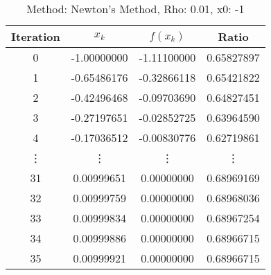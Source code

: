 \begin{table}
\centering
\caption{Method: Newton's Method, Rho: 0.01, x0: -1}
\label{tab:table_Newton's_Method_0_01_-1}
\begin{tabular}{c c c c}
\toprule
Iteration &       $x_k$ &    $f(x_k)$ &      Ratio \\
\midrule
        0 & -1.00000000 & -1.11100000 & 0.65827897 \\
        1 & -0.65486176 & -0.32866118 & 0.65421822 \\
        2 & -0.42496468 & -0.09703690 & 0.64827451 \\
        3 & -0.27197651 & -0.02852725 & 0.63964590 \\
        4 & -0.17036512 & -0.00830776 & 0.62719861 \\
   \vdots &      \vdots &      \vdots &     \vdots \\
       31 &  0.00999651 &  0.00000000 & 0.68969169 \\
       32 &  0.00999759 &  0.00000000 & 0.68968036 \\
       33 &  0.00999834 &  0.00000000 & 0.68967254 \\
       34 &  0.00999886 &  0.00000000 & 0.68966715 \\
       35 &  0.00999921 &  0.00000000 & 0.68966715 \\
\bottomrule
\end{tabular}
\end{table}
